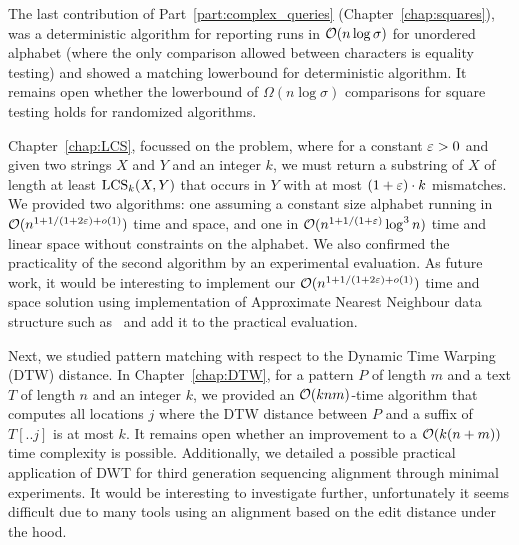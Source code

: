 The last contribution of Part~\ref{part:complex_queries} (Chapter~\ref{chap:squares}), was a deterministic algorithm for reporting runs in $\mathcal{O}(n\log\sigma)$ for unordered alphabet (where the only comparison allowed between characters is equality testing) and showed a matching lowerbound for deterministic algorithm. It remains open whether the lowerbound of $\Omega(n\log \sigma)$ comparisons for square testing holds for randomized algorithms.


Chapter~\ref{chap:LCS}, focussed on the \kApproxLCS problem, where for a constant $\varepsilon > 0$ and given two strings $X$ and $Y$ and an integer $k$, we must return a substring of $X$ of length at least $\mathrm{LCS}_{k}(X,Y)$ that occurs in $Y$ with at most $(1+\varepsilon) \cdot k$ mismatches. We provided two algorithms: one assuming a constant size alphabet running in $\mathcal{O}(n^{1+ 1/(1+2\varepsilon) + o(1)})$ time and space, and one in $\mathcal{O}(n^{1+1/(1+\varepsilon)} \log^3 n)$ time and linear space without constraints on the alphabet.  We also confirmed the practicality of the second algorithm by an experimental evaluation.
As future work, it would be interesting to implement our $\mathcal{O}(n^{1+ 1/(1+2\varepsilon) + o(1)})$ time and space solution using implementation of Approximate Nearest Neighbour data structure such as~\cite{spotify_annoy} and add it to the practical evaluation.

Next, we studied pattern matching with respect to the Dynamic Time Warping (DTW) distance. In Chapter~\ref{chap:DTW}, for a pattern $P$ of length $m$ and a text $T$ of length $n$ and an integer $k$, we provided an $\mathcal{O}(knm)$-time algorithm that computes all locations $j$ where the DTW distance between $P$ and a suffix of $T[..j]$ is at most $k$. It remains open whether an improvement to a $\mathcal{O}(k(n+m))$ time complexity is possible. Additionally, we detailed a possible practical application of DWT for third generation sequencing alignment through minimal experiments. It
would be interesting to investigate further, unfortunately it seems difficult due to many tools using an alignment based on the edit distance under the hood.    

